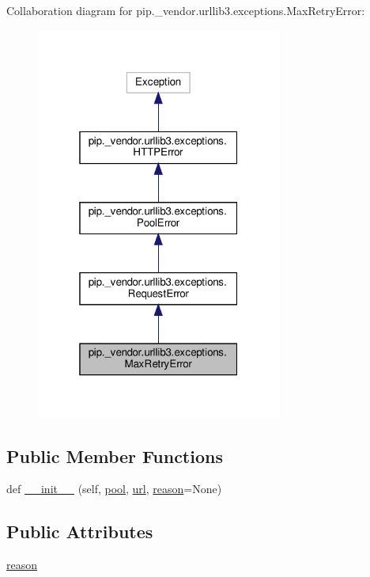 Collaboration diagram for pip.\+\_\+vendor.\+urllib3.\+exceptions.\+Max\+Retry\+Error\+:
\nopagebreak
\begin{figure}[H]
\begin{center}
\leavevmode
\includegraphics[width=229pt]{classpip_1_1__vendor_1_1urllib3_1_1exceptions_1_1MaxRetryError__coll__graph}
\end{center}
\end{figure}
\subsection*{Public Member Functions}
\begin{DoxyCompactItemize}
\item 
def \hyperlink{classpip_1_1__vendor_1_1urllib3_1_1exceptions_1_1MaxRetryError_a11a4099b2bcad99022ce7c2aada7769f}{\+\_\+\+\_\+init\+\_\+\+\_\+} (self, \hyperlink{classpip_1_1__vendor_1_1urllib3_1_1exceptions_1_1PoolError_a2953f9b92fd5cbcd2155a2aac9ef57c9}{pool}, \hyperlink{classpip_1_1__vendor_1_1urllib3_1_1exceptions_1_1RequestError_af4b69f97562d9547e8ee7af0d5485e1d}{url}, \hyperlink{classpip_1_1__vendor_1_1urllib3_1_1exceptions_1_1MaxRetryError_af676670dcc2882a217bf57e09640a708}{reason}=None)
\end{DoxyCompactItemize}
\subsection*{Public Attributes}
\begin{DoxyCompactItemize}
\item 
\hyperlink{classpip_1_1__vendor_1_1urllib3_1_1exceptions_1_1MaxRetryError_af676670dcc2882a217bf57e09640a708}{reason}
\end{DoxyCompactItemize}


